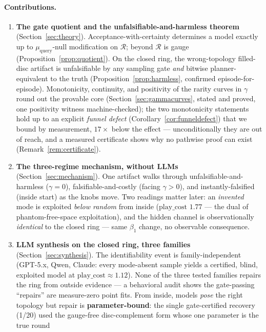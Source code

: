 \documentclass[11pt]{article}
\theoremstyle{remark}
\begin{document}
\paragraph{Contributions.}
\begin{enumerate}
\item \textbf{The gate quotient and the unfalsifiable-and-harmless theorem}
  (Section~\ref{sec:theory}). Acceptance-with-certainty determines a model
  exactly up to $\mu_{\mathrm{query}}$-null modification on $\mathcal{R}$;
  beyond $\mathcal{R}$ is gauge
  (Proposition~\ref{prop:quotient}). On the closed ring, the wrong-topology
  filled-disc artifact is unfalsifiable by any sampling gate \emph{and}
  bitwise planner-equivalent to the truth
  (Proposition~\ref{prop:harmless}, confirmed episode-for-episode).
  Monotonicity, continuity, and positivity of the rarity curves in $\gamma$
  round out the provable core (Section~\ref{sec:gammacurves}, stated and
  proved, one positivity witness machine-checked); the two monotonicity
  statements hold up to an explicit \emph{funnel defect}
  (Corollary~\ref{cor:funneldefect}) that we bound by measurement,
  $17\times$ below the effect --- unconditionally they are out of reach,
  and a measured certificate shows why no pathwise proof can exist
  (Remark~\ref{rem:certificate}).
\item \textbf{The three-regime mechanism, without LLMs}
  (Section~\ref{sec:mechanism}). One artifact walks through
  unfalsifiable-and-harmless ($\gamma = 0$), falsifiable-and-costly (facing
  $\gamma > 0$), and instantly-falsified (inside start) as the knobs move.
  Two readings matter later: an \emph{invented} mode is exploited
  \emph{below random} from inside ($\mathrm{play\_cost}$ $1.77$ --- the dual
  of phantom-free-space exploitation), and the hidden channel is
  observationally \emph{identical} to the closed ring --- same $\beta_1$
  change, no observable consequence.
\item \textbf{LLM synthesis on the closed ring, three families}
  (Section~\ref{sec:synthesis}). The identifiability event is
  family-independent (GPT-5.x, Qwen, Claude: every mode-absent sample yields
  a certified, blind, exploited model at $\mathrm{play\_cost} \approx
  1.12$). None of the three tested families repairs the ring from outside
  evidence --- a behavioral
  audit shows the gate-passing ``repairs'' are measure-zero point fits.
  From inside, models \emph{pose} the right topology but repair is
  \textbf{parameter-bound}: the single gate-certified recovery (1/20) used the
  gauge-free disc-complement form whose one parameter is the true round

\end{enumerate}
\end{document}
